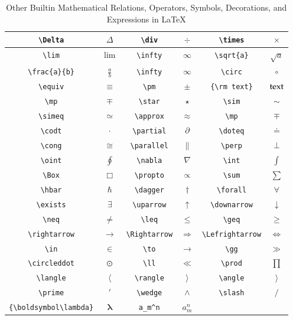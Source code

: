\begin{table}
\caption{Other Builtin Mathematical Relations, Operators, Symbols, Decorations, and Expressions in {\LaTeX}}
\begin{center}
\begin{tabular}{|c|c|c|c|c|c|} \hline
\verb"\Delta"  & $\Delta$ & \verb"\div" & $\div$ & \verb"\times" & $\times$ \bigstrut \\ \hline
\verb"\lim" & $\lim$ & \verb"\infty"  & $\infty$ & \verb"\sqrt{a}" & $\sqrt{a}$ \bigstrut \\ \hline
\verb"\frac{a}{b}" & $\frac{a}{b}$ & \verb"\infty" & $\infty$ & \verb"\circ"  & $\circ$ \bigstrut \\ \hline
\verb"\equiv" & $\equiv$ & \verb"\pm" & $\pm$ & \verb"{\rm text}" & ${\rm text}$  \bigstrut \\ \hline
\verb"\mp"  & $\mp$ & \verb"\star" & $\star$ & \verb"\sim" & $\sim$ \bigstrut \\ \hline
\verb"\simeq" & $\simeq$ & \verb"\approx"  & $\approx$ & \verb"\mp" & $\mp$ \bigstrut \\ \hline
\verb"\codt" & $\cdot$ & \verb"\partial" & $\partial$ & \verb"\doteq"  & $\doteq$ \bigstrut \\ \hline
\verb"\cong" & $\cong$ & \verb"\parallel" & $\parallel$ & \verb"\perp" & $\perp$  \bigstrut \\ \hline
\verb"\oint"  & $\oint$ & \verb"\nabla" & $\nabla$ & \verb"\int" & $\int$ \bigstrut \\ \hline
\verb"\Box" & $\Box$ & \verb"\propto"  & $\propto$ & \verb"\sum" & $\sum$ \bigstrut \\ \hline
\verb"\hbar" & $\hbar$ & \verb"\dagger" & $\dagger$  & \verb"\forall"  & $\forall$ \bigstrut \\ \hline
\verb"\exists" & $\exists$ & \verb"\uparrow" & $\uparrow$ & \verb"\downarrow" & $\downarrow$  \bigstrut \\ \hline
\verb"\neq"  & $\neq$ & \verb"\leq" & $\leq$ & \verb"\geq" & $\geq$ \bigstrut \\ \hline
\verb"\rightarrow" & $\rightarrow$  & \verb"\Rightarrow"  & $\Rightarrow$ & \verb"\Lefrightarrow" & $\Leftrightarrow$ \bigstrut \\ \hline
\verb"\in" & $\in$ & \verb"\to" & $\to$ & \verb"\gg"  & $\gg$ \bigstrut \\ \hline
\verb"\circleddot" & $\circleddot$ & \verb"\ll" & $\ll$ & \verb"\prod" & $\prod$  \bigstrut \\ \hline
\verb"\langle"  & $\langle$ & \verb"\rangle" & $\rangle$ & \verb"\angle" & $\rangle$ \bigstrut \\ \hline
\verb"\prime" & $\prime$  & \verb"\wedge"  & $\wedge$ & \verb"\slash" & $\slash$ \bigstrut \\ \hline
\verb"{\boldsymbol\lambda}" & ${\boldsymbol\lambda}$ & \verb"a_m^n" & $a_m^n$ & & \bigstrut \\ \hline
\end{tabular}
\end{center}
\label{tab_math_1}
\end{table}






